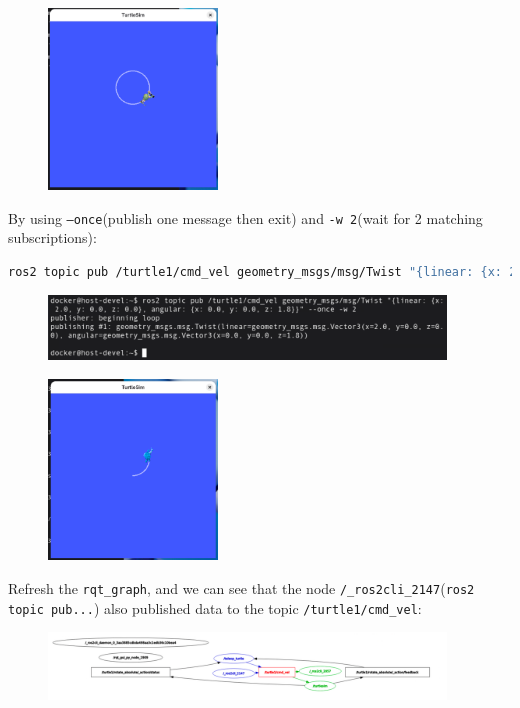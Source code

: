 \documentclass[12pt, a4paper]{article}
\begin{document}
\begin{enumerate}
\begin{figure}[h]
\end{figure}
\begin{figure}[h]
	\centering
	\includegraphics[width=0.4\textwidth]{p1.4-10}
\end{figure}
\newpage
By using \texttt{--once}(publish one message then exit) and  \texttt{-w 2}(wait for 2 matching subscriptions):
\begin{lstlisting}[language=bash]
ros2 topic pub /turtle1/cmd_vel geometry_msgs/msg/Twist "{linear: {x: 2.0, y: 0.0, z: 0.0}, angular: {x: 0.0, y: 0.0, z: 1.8}}" --once -w 2
\end{lstlisting}
\begin{figure}[h]
	\setlength{\leftskip}{2.4em}
	\includegraphics[width=0.94\textwidth]{p1.4-11}
\end{figure}
\begin{figure}[h]
	\centering
	\includegraphics[width=0.4\textwidth]{p1.4-12}
\end{figure}


\newpage
Refresh the \texttt{rqt\_graph}, and we can see that the node \texttt{/\_ros2cli\_2147}(\texttt{ros2 topic pub...}) also published data to the topic \texttt{/turtle1/cmd\_vel}:
\begin{figure}[h]
	\setlength{\leftskip}{2.4em}
	\includegraphics[width=0.94\textwidth]{p1.4-13}
\end{figure}



\end{enumerate}
\end{document}
